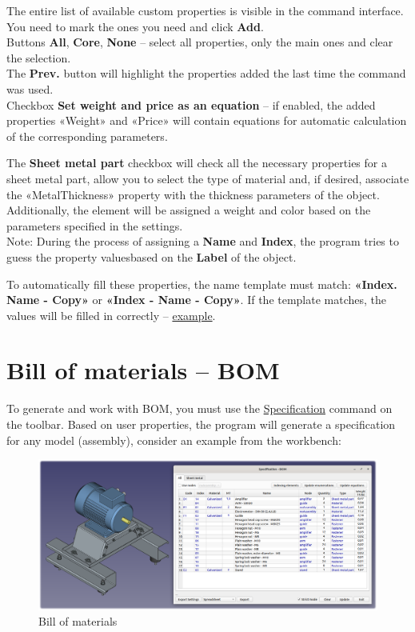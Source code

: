 \documentclass[a4paper,12pt]{article}
\begin{document}
The entire list of available custom properties is visible in the command interface. You need to mark the ones you need and click \textbf{Add}.\\

Buttons \textbf{All}, \textbf{Core}, \textbf{None} -- select all properties, only the main ones and clear the selection.\\The \textbf{Prev.} button will highlight the properties added the last time the command was used.\\

Checkbox \textbf{Set weight and price as an equation} -- if enabled, the added properties «Weight» and «Price» will contain equations for automatic calculation of the corresponding parameters.

The \textbf{Sheet metal part} checkbox will check all the necessary properties for a sheet metal part, allow you to select the type of material and, if desired, associate the «MetalThickness» property with the thickness parameters of the object. Additionally, the element will be assigned a weight and color based on the parameters specified in the settings.\\

Note: During the process of assigning a \textbf{Name} and \textbf{Index}, the program tries to guess the property values ​​based on the \textbf{Label} of the object.

To automatically fill these properties, the name template must match: \textbf{«Index. Name - Copy»} or \textbf{«Index - Name - Copy»}. If the template matches, the values ​​will be filled in correctly -- \hyperref[sec:properties]{example}.

\pagebreak




\section{Bill of materials -- BOM}

To generate and work with BOM, you must use the \hyperref[sec:4]{Specification} command on the toolbar. Based on user properties, the program will generate a specification for any model (assembly), consider an example from the workbench:

\begin{figure}[htp]
	\centering
	\includegraphics[width=1\textwidth]{img/specification_all.png}
	\caption{Bill of materials}
	\label{sec:specification_all}
\end{figure}
\end{document}
